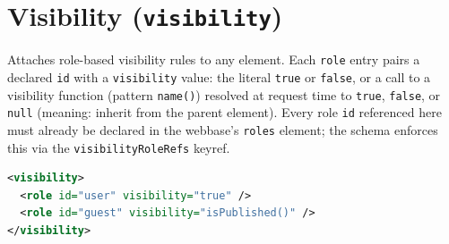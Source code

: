 \section{Visibility (\texttt{visibility})}
\label{sec:xsd-visibility}
Attaches role-based visibility rules to any element. Each \texttt{role} entry pairs a declared \texttt{id} with a \texttt{visibility} value: the literal \texttt{true} or \texttt{false}, or a call to a visibility function (pattern \texttt{name()}) resolved at request time to \texttt{true}, \texttt{false}, or \texttt{null} (meaning: inherit from the parent element). Every role \texttt{id} referenced here must already be declared in the webbase's \texttt{roles} element; the schema enforces this via the \texttt{visibilityRoleRefs} keyref.
\begin{lstlisting}[language=XML,caption={Role-based visibility}]
<visibility>
  <role id="user" visibility="true" />
  <role id="guest" visibility="isPublished()" />
</visibility>
\end{lstlisting}
